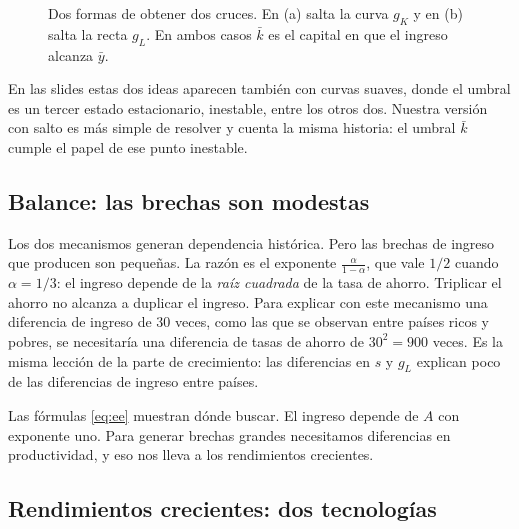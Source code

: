 \documentclass[12pt,letterpaper]{article}
\begin{document}
\begin{figure}[htb]
\caption{Dos formas de obtener dos cruces. En (a) salta la curva $g_K$ y en (b) salta la recta $g_L$. En ambos casos $\bar k$ es el capital en que el ingreso alcanza $\bar y$.}
\label{fig:retro}
\end{figure}

En las slides estas dos ideas aparecen también con curvas suaves, donde el umbral es un tercer estado estacionario, inestable, entre los otros dos. Nuestra versión con salto es más simple de resolver y cuenta la misma historia: el umbral $\bar k$ cumple el papel de ese punto inestable.

\subsection{Balance: las brechas son modestas}

Los dos mecanismos generan dependencia histórica. Pero las brechas de ingreso que producen son pequeñas. La razón es el exponente $\frac{\alpha}{1-\alpha}$, que vale $1/2$ cuando $\alpha=1/3$: el ingreso depende de la \emph{raíz cuadrada} de la tasa de ahorro. Triplicar el ahorro no alcanza a duplicar el ingreso. Para explicar con este mecanismo una diferencia de ingreso de 30 veces, como las que se observan entre países ricos y pobres, se necesitaría una diferencia de tasas de ahorro de $30^2=900$ veces. Es la misma lección de la parte de crecimiento: las diferencias en $s$ y $g_L$ explican poco de las diferencias de ingreso entre países.

Las fórmulas \eqref{eq:ee} muestran dónde buscar. El ingreso depende de $A$ con exponente uno. Para generar brechas grandes necesitamos diferencias en productividad, y eso nos lleva a los rendimientos crecientes.

\subsection{Rendimientos crecientes: dos tecnologías}
\end{document}
